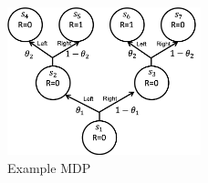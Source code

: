 
\begin{figure}
    \centering
    \includegraphics[width=0.5\textwidth]{figures/policy_diff.png}
    \caption{Example MDP}
    \label{fig:policy-diff-example}
\end{figure}

